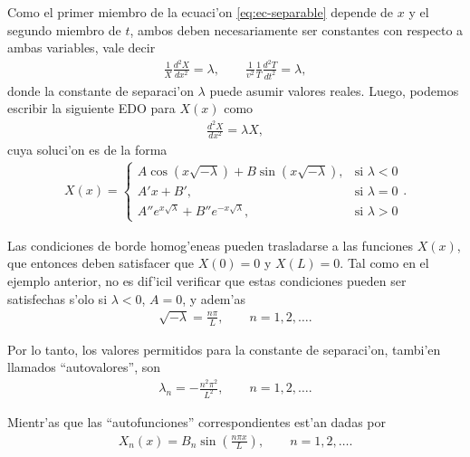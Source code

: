 Como el primer miembro de la ecuaci'on \eqref{eq:ec-separable} depende de $x$ y el segundo miembro de $t$, ambos deben necesariamente ser constantes con respecto a ambas variables, vale decir
\begin{align}
\frac{1}{X}\frac{d^2 X}{dx^2}=\lambda, \qquad \frac{1}{v^2}\frac{1}{T}\frac{d^2 T}{dt^2}=\lambda,
\end{align}
donde la constante de separaci'on $\lambda$ puede asumir valores reales. Luego, podemos escribir la siguiente EDO para $X(x)$ como
\begin{align}
\frac{d^2 X}{dx^2}=\lambda X,
\end{align}
cuya soluci'on es de la forma
\begin{align}
X(x)=
\begin{cases}
A \cos(x\sqrt{-\lambda})+B \sin(x\sqrt{-\lambda}), & \text{si }\lambda<0\\
A' x+B', & \text{si }\lambda=0\\
A'' e^{x\sqrt{\lambda}}+B'' e^{-x\sqrt{\lambda}}, & \text{si }\lambda >0
\end{cases}.
\end{align}

Las condiciones de borde homog'eneas pueden trasladarse a las funciones $X(x)$, que entonces deben satisfacer que $X(0)=0$ y $X(L)=0$. 
Tal como en el ejemplo anterior, no es dif'icil verificar que estas condiciones pueden ser satisfechas s'olo si $\lambda < 0$, $A=0$, y adem'as 
\begin{align}
\sqrt{-\lambda}=\frac{n\pi}{L},\qquad n=1,2,\dots.
\end{align} 

Por lo tanto, los valores permitidos para la constante de separaci'on, tambi'en llamados ``autovalores'', son
\begin{align}\label{LnEO1D}
\lambda_{n}=-\frac{n^2 \pi^2}{L^2},\qquad n=1,2,\hdots.
\end{align}

Mientr'as que las ``autofunciones'' correspondientes est'an dadas por
\begin{align}
X_{n}(x)=B_n\sin\left(\frac{n \pi x}{L}\right),\qquad n=1,2,\hdots.
\end{align}

